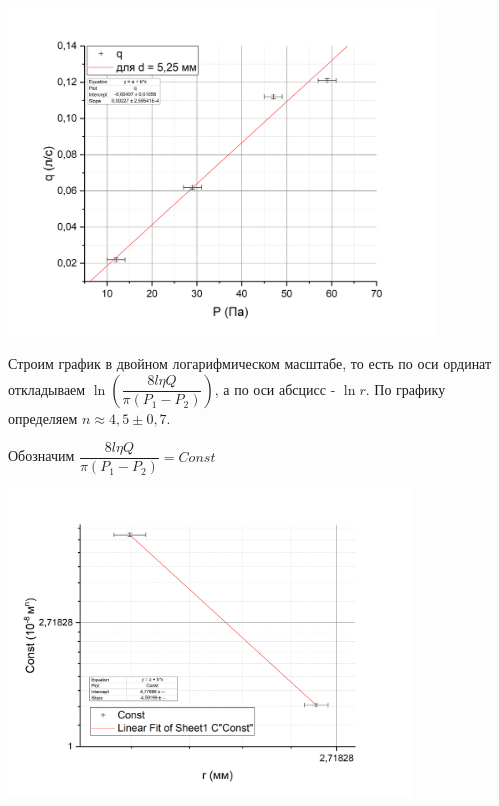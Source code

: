 \documentclass[a4paper, 12pt]{article}%
\begin{document}
\begin{enumerate}
\includegraphics[width = 0.85\textwidth]{133_7.jpg}

Строим график в двойном логарифмическом масштабе, то есть по оси ординат откладываем $\ln \left( \dfrac{8 l \eta Q}{\pi (P_1 - P_2)}\right)$, а по оси абсцисс - $\ln r$. По графику определяем $n \approx 4,5 \pm 0,7$.

Обозначим $\dfrac{8 l \eta Q}{\pi (P_1 - P_2)} = Const$

\includegraphics[width = 0.8\textwidth]{133_8.jpg}


\end{enumerate}
\end{document}
